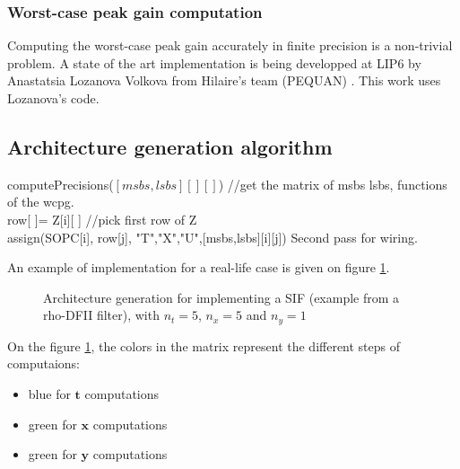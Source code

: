 		\subsubsection{Worst-case peak gain computation}
			Computing the worst-case peak gain accurately in finite precision is a non-trivial problem.
			A state of the art implementation is being developped at LIP6 by Anastatsia Lozanova Volkova from Hilaire's team (PEQUAN) \cite{Volk15a}.
			This work uses Lozanova's code.


\subsection{Architecture generation algorithm}

	\begin{algorithm}[H]
	computePrecisions($[msbs,lsbs][][]$) //get the matrix of msbs lsbs, functions of the wcpg. \\
	 {
	 	row[ ]= Z[i][ ] //pick first row of Z \\
	 	 {
	 		assign(SOPC[i], row[j], {"T","X","U"},[msbs,lsbs][i][j])
	 	}
		Second pass for wiring.
	}
	\end{algorithm}

	An example of implementation for a real-life case is given on figure \ref{fig:SIFimpl}.

	\begin{figure}[!h]
	\begin{center}
	\scalebox{6.5}{}
	\end{center}
	\caption{ Architecture generation for implementing a SIF (example from a rho-DFII filter), with $n_t=5$, $n_x=5$ and $n_y=1$ \label{fig:SIFimpl}}
	\end{figure}

	On the figure \ref{fig:SIFimpl}, the colors in the matrix represent the different steps of computaions:
	\begin{itemize}
		\item blue for $\boldsymbol{t}$ computations
		\item green for $\boldsymbol{x}$ computations
		\item green for $\boldsymbol{y}$ computations
	\end{itemize}

